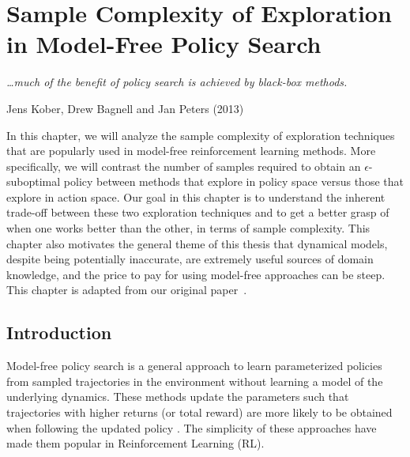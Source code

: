 
\chapter{Sample Complexity of Exploration in Model-Free Policy Search}
\label{CHA:ARS}

\epigraph{\textit{\ldots much of the benefit of policy search is achieved
by black-box methods.}}{Jens Kober, Drew Bagnell and Jan Peters
(2013)}

In this chapter, we will analyze the sample complexity of exploration
techniques that are popularly used in model-free reinforcement
learning methods. More specifically, we will contrast the number of
samples required to obtain an $\epsilon$-suboptimal policy between
methods that explore in policy space versus those that explore in
action space. Our goal in this chapter is to understand the
inherent trade-off between these two exploration techniques and to get
a better grasp of when one works better than the other, in terms of
sample complexity. This chapter also motivates the general theme of
this thesis that dynamical models, despite being potentially
inaccurate, are extremely useful sources of domain knowledge, and the
price to pay for using model-free approaches can be steep. This chapter is
adapted from our original paper~\cite{aistats19}.

\section{Introduction}
Model-free policy search is a general approach to learn parameterized
policies from sampled trajectories in the environment without
learning a model of the underlying dynamics. These methods
update the parameters such that trajectories with higher returns (or total reward) are
more likely to be obtained when following the updated policy
\citep{kober2013reinforcement}. The simplicity of these approaches have
made them popular in Reinforcement Learning (RL).

